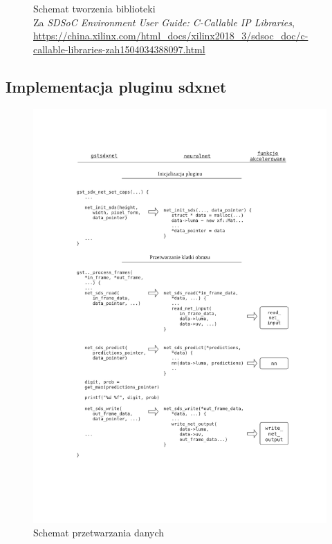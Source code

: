 \documentclass[12pt, oneside, a4paper]{article}
\begin{document}
\begin{figure}[h]
  \centering
  
  \caption{Schemat tworzenia biblioteki \\
  Za \textit{SDSoC Environment User Guide: C-Callable IP Libraries},
  \url{https://china.xilinx.com/html_docs/xilinx2018_3/sdsoc_doc/c-callable-libraries-zah1504034388097.html}}\label{fig:ccallable}
\end{figure}

\newpage
\subsection{Implementacja pluginu sdxnet}\label{sec:Implementacja pluginu sdxnet}
\begin{figure}
  \centering
  \includegraphics[width=\linewidth,
    trim={3cm 4cm 2.5cm 3cm}, clip]
  {figures/kod-scheme.pdf}
  \caption{Schemat przetwarzania danych}\label{fig:code-scheme}
\end{figure}
\end{document}
